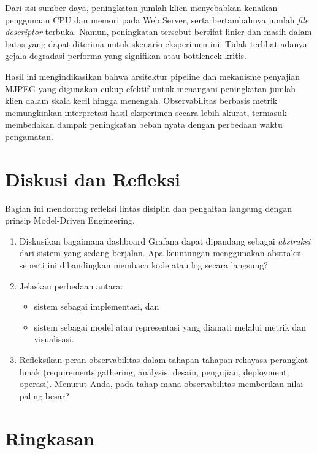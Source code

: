 Dari sisi sumber daya, peningkatan jumlah klien menyebabkan kenaikan penggunaan CPU dan memori pada Web Server, serta bertambahnya jumlah \emph{file descriptor} terbuka. Namun, peningkatan tersebut bersifat linier dan masih dalam batas yang dapat diterima untuk skenario eksperimen ini. Tidak terlihat adanya gejala degradasi performa yang signifikan atau bottleneck kritis.

Hasil ini mengindikasikan bahwa arsitektur pipeline dan mekanisme penyajian MJPEG yang digunakan cukup efektif untuk menangani peningkatan jumlah klien dalam skala kecil hingga menengah. Observabilitas berbasis metrik memungkinkan interpretasi hasil eksperimen secara lebih akurat, termasuk membedakan dampak peningkatan beban nyata dengan perbedaan waktu pengamatan.



\section{Diskusi dan Refleksi}

Bagian ini mendorong refleksi lintas disiplin dan pengaitan langsung dengan prinsip Model-Driven Engineering.

\begin{enumerate}
  \item Diskusikan bagaimana dashboard Grafana dapat dipandang sebagai \emph{abstraksi} dari sistem yang sedang berjalan.  
  Apa keuntungan menggunakan abstraksi seperti ini dibandingkan membaca kode atau log secara langsung?

  \item Jelaskan perbedaan antara:
  \begin{itemize}
    \item sistem sebagai implementasi, dan
    \item sistem sebagai model atau representasi yang diamati melalui metrik dan visualisasi.
  \end{itemize}

  \item Refleksikan peran observabilitas dalam tahapan-tahapan rekayasa perangkat lunak (requirements gathering, analysis, desain,  pengujian, deployment, operasi).  
  Menurut Anda, pada tahap mana observabilitas memberikan nilai paling besar?
\end{enumerate}

\section{Ringkasan}


